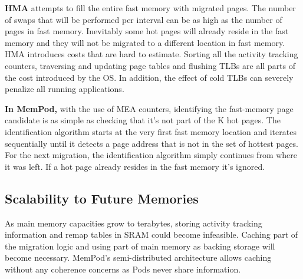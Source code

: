     \textbf{HMA} attempts to fill the entire fast memory with migrated pages. The number of swaps that will be performed per interval can be as high as the number of pages in fast memory. Inevitably some hot pages will already reside in the fast memory and they will not be migrated to a different location in fast memory. HMA introduces costs that are hard to estimate. Sorting all the activity tracking counters, traversing and updating page tables and flushing TLBs are all parts of the cost introduced by the OS. In addition, the effect of cold TLBs can severely penalize all running applications. %

	\textbf{In MemPod,} with the use of MEA counters, identifying the fast-memory page candidate is as simple as checking that it's not part of the K hot pages. The identification algorithm starts at the very first fast memory location and iterates sequentially until it detects a page address that is not in the set of hottest pages. For the next migration, the identification algorithm simply continues from where it was left. If a hot page already resides in the fast memory it's ignored.

\subsection{Scalability to Future Memories}


As main memory capacities grow to terabytes, storing activity tracking information and remap tables in SRAM could become infeasible. Caching part of the migration logic and using part of main memory as backing storage will become necessary. MemPod's semi-distributed architecture allows caching without any coherence concerns as Pods never share information. %

